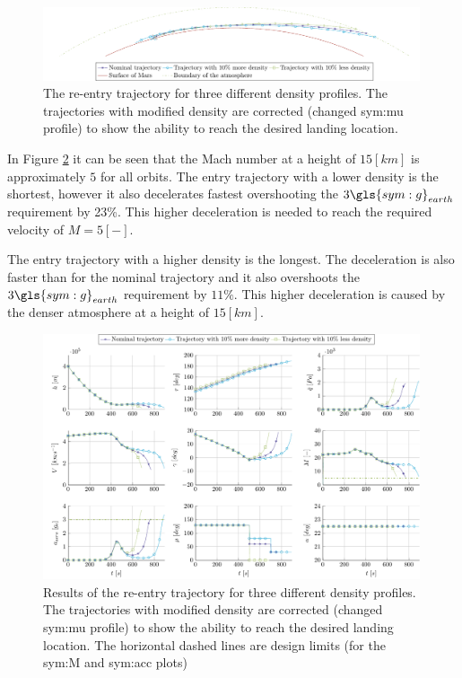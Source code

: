 \begin{figure}[h]
	\centering
	\includegraphics[width=0.99\textwidth]{Figure/Orbit/entry_mars.pdf}
	\caption[The re-entry trajectory for three different density profiles]{The re-entry trajectory for three different density profiles. The trajectories with modified density are corrected (changed \gls{sym:mu} profile) to show the ability to reach the desired landing location.}
	\label{fig:entry_mars}
\end{figure}

In Figure \ref{fig:orbit_entry_data} it can be seen that the Mach number at a height of $15 \left[km\right]$ is approximately $5$ for all orbits. The entry trajectory with a lower density is the shortest, however it also decelerates fastest overshooting the $3 \gls{sym:g}_{earth}$ requirement by 23\%. This higher deceleration is needed to reach the required velocity of $M=5\left[-\right]$.

The entry trajectory with a higher density is the longest. The deceleration is also faster than for the nominal trajectory and it also overshoots the $3 \gls{sym:g}_{earth}$ requirement by $11\%$. This higher deceleration is caused by the denser atmosphere at a height of $15 \left[km\right]$.

\begin{figure}
	\centering
	\includegraphics[width=0.99\textwidth]{Figure/Orbit/sensitivity_entry.pdf}
	\caption[Results of the re-entry trajectory for three different density profiles]{Results of the re-entry trajectory for three different density profiles. The trajectories with modified density are corrected (changed \gls{sym:mu} profile) to show the ability to reach the desired landing location. The horizontal dashed lines are design limits (for the \gls{sym:M} and \gls{sym:acc} plots)}
	\label{fig:orbit_entry_data}
\end{figure}

